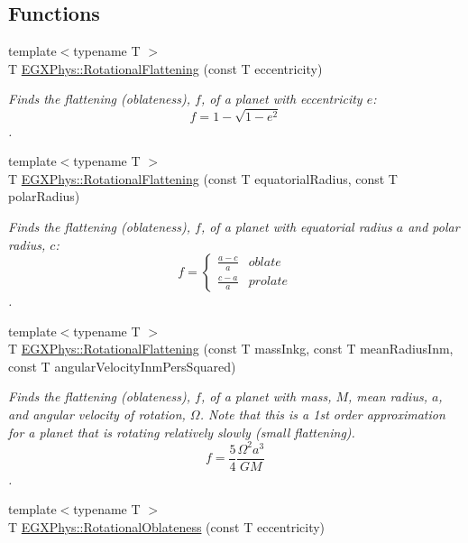 \subsection*{Functions}
\begin{DoxyCompactItemize}
\item 
{\footnotesize template$<$typename T $>$ }\\T \mbox{\hyperlink{group___e_g_x_phys-_astrophysics-_rotational_flattening_gabba90db442c4ec9e12523adb00d66c44}{E\+G\+X\+Phys\+::\+Rotational\+Flattening}} (const T eccentricity)
\begin{DoxyCompactList}\small\item\em Finds the flattening (oblateness), $f$, of a planet with eccentricity $e$\+: \[ f = 1 - \sqrt{1-e^2} \]. \end{DoxyCompactList}\item 
{\footnotesize template$<$typename T $>$ }\\T \mbox{\hyperlink{group___e_g_x_phys-_astrophysics-_rotational_flattening_ga1840fed2081c35f68c4b8bfa75248977}{E\+G\+X\+Phys\+::\+Rotational\+Flattening}} (const T equatorial\+Radius, const T polar\+Radius)
\begin{DoxyCompactList}\small\item\em Finds the flattening (oblateness), $f$, of a planet with equatorial radius $a$ and polar radius, $c$\+: \[ f =\begin{cases} \frac{a-c}{a}{} & oblate \\ \frac{c-a}{a} & prolate \end{cases} \]. \end{DoxyCompactList}\item 
{\footnotesize template$<$typename T $>$ }\\T \mbox{\hyperlink{group___e_g_x_phys-_astrophysics-_rotational_flattening_ga316b9afb6e1aa940fa96417c6f24ed4d}{E\+G\+X\+Phys\+::\+Rotational\+Flattening}} (const T mass\+Inkg, const T mean\+Radius\+Inm, const T angular\+Velocity\+Inm\+Pers\+Squared)
\begin{DoxyCompactList}\small\item\em Finds the flattening (oblateness), $f$, of a planet with mass, $M$, mean radius, $a$, and angular velocity of rotation, $\Omega$. Note that this is a 1st order approximation for a planet that is rotating relatively slowly (small flattening). \[ f = \frac{5}{4} \frac{\Omega^2 a^3}{GM} \]. \end{DoxyCompactList}\item 
{\footnotesize template$<$typename T $>$ }\\T \mbox{\hyperlink{group___e_g_x_phys-_astrophysics-_rotational_flattening_ga494ad3b296185bf65ccf3e2ddebc189a}{E\+G\+X\+Phys\+::\+Rotational\+Oblateness}} (const T eccentricity)

\end{DoxyCompactItemize}
